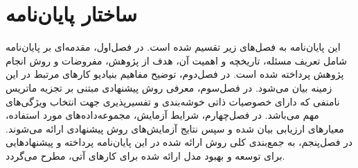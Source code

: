 \section{ساختار پایا‌ن‌نامه}

این پایا‌ن‌نامه به فصل‌های زیر تقسیم شده ‌است. در فصل‌اول، مقدمه‌ای بر پایا‌ن‌نامه شامل تعریف مسئله، تاریخچه و اهمیت آن،‌ هدف از پژوهش، مفروضات و روش انجام پژوهش پرداخته شده است. در فصل‌دوم، توضیح مفاهیم بنیادیو کارهای مرتبط در این زمینه بیان می‌شود. در فصل‌سوم، معرفی روش پیشنهادی مبتنی بر تجزیه ماتریس نامنفی \cite{lee1999learning} که دارای خصوصیات ذاتی خوشه‌بندی و تفسیرپذیری جهت انتخاب ویژگی‌های مهم می‌باشد. در فصل‌چهارم، شرایط آزمایش، مجموعه‌داده‌های مورد استفاده، معیارهای ارزیابی بیان شده و سپس نتایج آزمایش‌های روش پیشنهادی ارائه می‌شوند. در فصل‌پنجم، به جمع‌بندی کلی روش‌ ارائه شده در این پایا‌ن‌نامه پرداخته و پیشنهادهایی برای توسعه و بهبود مدل ارائه شده برای کارهای آتی، مطرح می‌‌گردد.